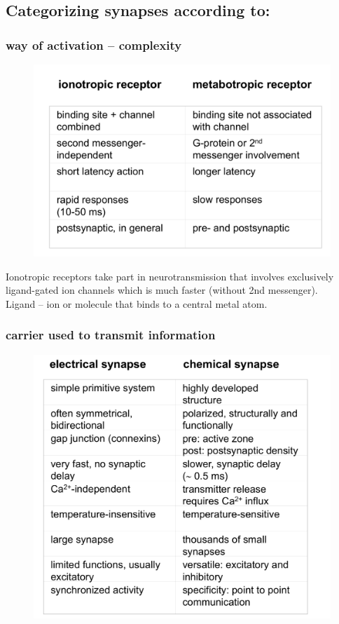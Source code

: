\documentclass[english,11pt]{article}
\begin{document}
\subsection{Categorizing synapses according to:}

\subsubsection{way of activation -- complexity}
\begin{figure}[htbp]
\centering
  \includegraphics[scale=0.25]{images/6_2.jpg}
\end{figure} 

Ionotropic receptors take part in neurotransmission that involves exclusively ligand-gated ion channels which is much faster (without 2nd messenger).\\
Ligand --  ion or molecule that binds to a central metal atom.

\newpage
\subsubsection{carrier used to transmit information}
\begin{figure}[htbp]
\centering
  \includegraphics[scale=0.25]{images/6_1.jpg}
\end{figure} 
\end{document}

